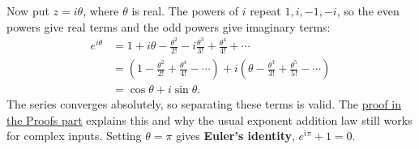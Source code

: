 Now put $z=i\theta$, where $\theta$ is real. The powers of $i$ repeat
$1,i,-1,-i$, so the even powers give real terms and the odd powers
give imaginary terms:
\begin{align*}
e^{i\theta}
&=1+i\theta-\frac{\theta^2}{2!}-i\frac{\theta^3}{3!}
  +\frac{\theta^4}{4!}+\cdots\\
&=\left(1-\frac{\theta^2}{2!}+\frac{\theta^4}{4!}-\cdots\right)
 +i\left(\theta-\frac{\theta^3}{3!}+\frac{\theta^5}{5!}-\cdots\right)\\
&=\cos\theta+i\sin\theta.
\end{align*}
The series converges absolutely, so separating these terms is valid.
The \hyperref[proof:eulers-formula]{proof in the Proofs part} explains
this and why the usual exponent addition law still works for complex
inputs. Setting $\theta=\pi$ gives \textbf{Euler's identity},
$e^{i\pi}+1=0$.








